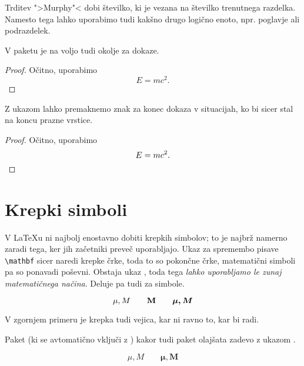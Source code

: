 Trditev ">Murphy"< dobi številko, ki je vezana na številko trenutnega razdelka.
Namesto tega lahko uporabimo tudi kakšno drugo logično enoto, npr. 
poglavje ali podrazdelek.

V paketu  je na voljo tudi okolje  za dokaze.

\begin{example}
\begin{proof}
 Očitno, uporabimo
\[E=mc^2.\]
\end{proof}
\end{example}

Z ukazom  lahko premaknemo znak za konec dokaza
v situacijah, ko bi sicer stal na koncu prazne vrstice.

\begin{example}
\begin{proof}
 Očitno, uporabimo
\[E=mc^2. \qedhere\]
\end{proof}
\end{example}

\section{Krepki simboli}

V \LaTeX{}u ni najbolj enostavno dobiti krepkih simbolov; to je najbrž namerno zaradi tega, ker 
jih začetniki preveč uporabljajo. Ukaz za spremembo pisave
\verb|\mathbf| sicer naredi krepke črke, toda to so pokončne črke, matematični simboli pa so ponavadi 
poševni. Obstaja ukaz , toda tega \emph{lahko uporabljamo le zunaj matematičnega načina}.
Deluje pa tudi za simbole.
\begin{example}
\begin{displaymath}
\mu, M \qquad \mathbf{M} \qquad
\mbox{\boldmath $\mu, M$}
\end{displaymath}
\end{example}

\noindent
V zgornjem primeru je krepka tudi vejica, kar ni ravno to, kar bi radi.

Paket  (ki se avtomatično vključi z ) kakor tudi paket
 olajšata zadevo z ukazom .
\ifx\boldsymbol\undefined\else
\begin{example}
\begin{displaymath}
\mu, M \qquad
\boldsymbol{\mu}, \boldsymbol{M}
\end{displaymath}
\end{example}
\fi

